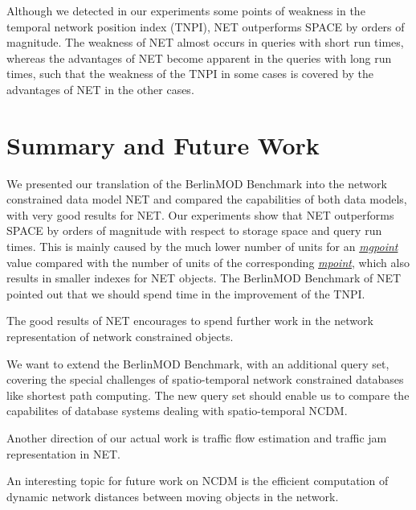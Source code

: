 \documentclass[a4paper]{article}
\newcommand{\bmodb} {BerlinMOD Benchmark}
\newcommand{\dt}[1]{\textsl{\underline{#1}}}
\begin{document}
Although we detected in our experiments some points of weakness in the temporal
network position index (TNPI), NET outperforms SPACE by orders of magnitude. The
weakness of NET almost occurs in queries with short run times, whereas the advantages
of NET become apparent in the queries with long run times, such that the weakness
of the TNPI in some cases is covered by the advantages of NET in the other cases.
\section{Summary and Future Work}
\label{sec:summary}
We presented our translation of the \bmodb{} into the network constrained data model
NET and compared the capabilities of both data models, with very good results for
NET. Our experiments show that NET outperforms
SPACE by orders of magnitude with respect to storage space and query run times.
This is mainly caused by the much lower number of units for an \dt{mgpoint} value
compared with the number of units of the corresponding \dt{mpoint}, which also
results in smaller indexes for NET objects. The \bmodb{} of NET pointed out
that we should spend time in the improvement of the TNPI.

The good results of NET encourages to spend further work in the network representation
of network constrained objects.

We want to extend the \bmodb{}, with an additional query set, covering the
special challenges of spatio-temporal network constrained databases like
shortest path computing. The new query set should enable us to compare the
capabilites of database systems dealing with spatio-temporal NCDM.

Another direction of our actual work is traffic flow estimation and traffic jam
representation in NET.

An interesting topic for future work on NCDM is the efficient
computation of dynamic network distances between moving objects in the network.
{}

\appendix
\end{document}
